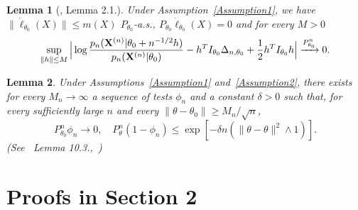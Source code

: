 \documentclass[11pt]{article}
\theoremstyle{plain}
\newtheorem{lemma}{\quad\quad Lemma}
\theoremstyle{definition}
\theoremstyle{remark}
\begin{document}
\begin{appendices}

\begin{lemma}[\cite{Kleijn2012The}, Lemma 2.1.]\label{Thm:localExpansion}
    Under Assumption~\ref{Assumption1},
    we have $\|\dot{\ell}_{\theta_0}(X)\|\leq m(X)$ $P_{\theta_0}$-a.s., $P_{\theta_0} \dot{\ell}_{\theta_0}(X)=0$ and for every $M>0$
    \begin{equation*}
        \sup_{\|h\|\leq M}\Big|
         \log \frac{p_n(\mathbf{X}^{(n)}|\theta_0+n^{-1/2}h)}{p_n(\mathbf{X}^{(n)}|\theta_0)}-h^T I_{\theta_0}\Delta_{n,\theta_0}+\frac{1}{2}h^T I_{\theta_0}h
         \Big|\xrightarrow{P^n_{\theta_0}}0.
    \end{equation*}
\end{lemma}

\begin{lemma}\label{Thm:someTest}
    Under Assumptions~\ref{Assumption1} and~\ref{Assumption2},
    there exists for every $M_n\to \infty$ a sequence of tests $\phi_n$ and a constant $\delta>0$ such that, for every sufficiently large $n$ and every $\|\theta-\theta_0\|\geq M_n/\sqrt{n}$,
    $$
    P^n_{\theta_0} \phi_n\to 0,\quad
    P^n_{\theta} (1-\phi_n)\leq \exp[-\delta n(\|\theta-\theta\|^2\wedge 1)].
    $$
    (See~\cite{van2000asymptotic} Lemma 10.3.,~\cite{Kleijn2012The})
\end{lemma}
    \section{Proofs in Section 2}


\end{appendices}
\end{document}
